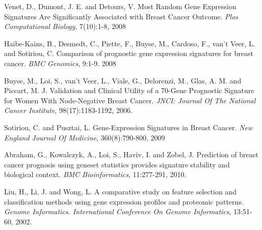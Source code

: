 \documentclass[11pt]{article}
\begin{document}
\begin{thebibliography}{9}

\cite{bibitem-Venet} Venet, D., Dumont, J. E. and Detours, V. Most Random Gene Expression Signatures Are Significantly Associated with Breast Cancer Outcome. \emph{Plos Computational Biology}, 7(10):1-8, 2008

\cite{bibitem-Haibe} Haibe-Kains, B., Desmedt, C., Piette, F., Buyse, M., Cardoso, F., van't Veer, L. and Sotiriou, C. Comparison of prognostic gene expression signatures for breast cancer. \emph{BMC Genomics}, 9:1-9. 2008

\cite{bibitem-Buyse} Buyse, M., Loi, S., van't Veer, L., Viale, G., Delorenzi, M., Glas, A. M. and Piccart, M. J. Validation and Clinical Utility of a 70-Gene Prognostic Signature for Women With Node-Negative Breast Cancer. \emph{JNCI: Journal Of The National Cancer Institute}, 98(17):1183-1192, 2006. 

\cite{bibitem-Sotiriou} Sotiriou, C. and Pusztai, L. Gene-Expression Signatures in Breast Cancer. \emph{New England Journal Of Medicine}, 360(8):790-800, 2009

\cite{bibitem-Abraham} Abraham, G., Kowalczyk, A., Loi, S., Haviv, I. and Zobel, J. Prediction of breast cancer prognosis using geneset statistics provides signature stability and biological context. \emph{BMC Bioinformatics}, 11:277-291, 2010.

\cite{bibitem-Liu} Liu, H., Li, J. and Wong, L. A comparative study on feature selection and classification methods using gene expression profiles and proteomic patterns. \emph{Genome Informatics. International Conference On Genome Informatics}, 13:51-60, 2002.
\end{thebibliography}
\end{document}
